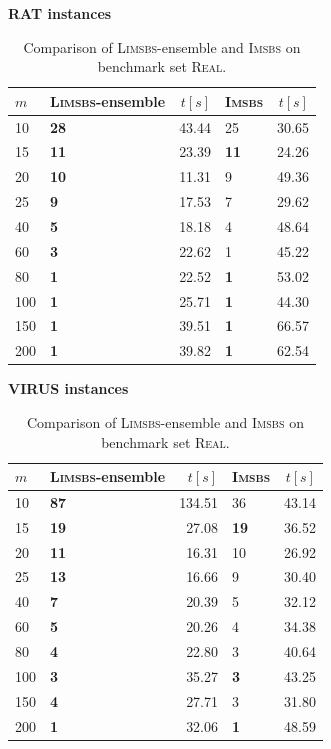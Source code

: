 \begin{table}[!ht]
	\centering
	\caption{Comparison of \textsc{Limsbs}-ensemble and \textsc{Imsbs} on benchmark set \textsc{Real}.}
	\label{tab:real_results}
	
	\begin{minipage}{0.45\textwidth}
		\centering
		\textbf{RAT instances}
		\begin{tabular}{l|lr|lr}
			\hline
			$m$ & \textsc{Limsbs}-ensemble & ${t}[s]$ & \textsc{Imsbs} & ${t}[s]$ \\
			\hline \hline
			10 & \textbf{28} & 43.44 & 25          & 30.65 \\
			15 & \textbf{11} & 23.39 & \textbf{11} & 24.26 \\
			20 & \textbf{10} & 11.31 & 9           & 49.36 \\
			25 & \textbf{9}  & 17.53 & 7           & 29.62 \\
			40 & \textbf{5}  & 18.18 & 4           & 48.64 \\
			60 & \textbf{3}  & 22.62 & 1           & 45.22 \\
			80 & \textbf{1}  & 22.52 & \textbf{1}  & 53.02 \\
			
			100 & \textbf{1}  & 25.71 & \textbf{1}  & 44.30 \\

			150 & \textbf{1}  & 39.51 & \textbf{1}  & 66.57 \\

			200 & \textbf{1}  & 39.82 & \textbf{1}  & 62.54 \\

			\hline
		\end{tabular}
	\end{minipage}
	\hfill \hfill
	\begin{minipage}{0.45\textwidth}
		\centering
		\textbf{VIRUS instances}
		\begin{tabular}{l|lr|lr}
			\hline
			$m$ & \textsc{Limsbs}-ensemble & ${t}[s]$ & \textsc{Imsbs} & ${t}[s]$ \\
			\hline \hline		
			10 & \textbf{87} & 134.51 & 36         & 43.14 \\
			15 & \textbf{19} & 27.08 & \textbf{19} & 36.52 \\
			20 & \textbf{11} & 16.31 & 10          & 26.92 \\
			25 & \textbf{13} & 16.66 & 9           & 30.40 \\
			40 & \textbf{7}  & 20.39 & 5           & 32.12 \\
			60 & \textbf{5}  & 20.26 & 4           & 34.38 \\
			80 & \textbf{4}  & 22.80 & 3           & 40.64 \\
			100 & \textbf{3}  & 35.27 & \textbf{3}  & 43.25 \\
			150 & \textbf{4}  & 27.71 & 3           & 31.80 \\
			200 & \textbf{1}  & 32.06 & \textbf{1}  & 48.59 \\
			\hline
		\end{tabular}
	\end{minipage}
	
\end{table}